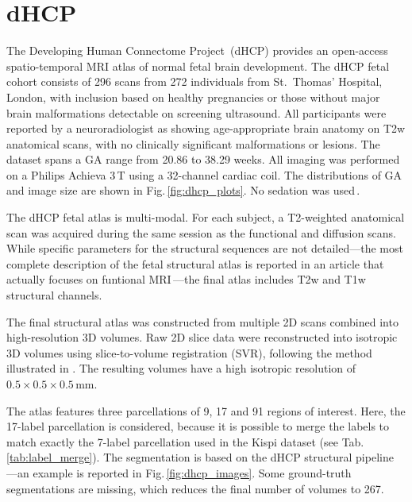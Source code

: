 \section{dHCP}
The Developing Human Connectome Project\,\cite{dHCP} (dHCP) provides an open-access spatio-temporal MRI atlas of normal fetal brain development. The dHCP fetal cohort consists of 296 scans from 272 individuals from St.\ Thomas' Hospital, London, with inclusion based on healthy pregnancies or those without major brain malformations detectable on screening ultrasound. All participants were reported by a neuroradiologist as showing age-appropriate brain anatomy on T2w anatomical scans, with no clinically significant malformations or lesions. The dataset spans a GA range from 20.86 to 38.29 weeks. All imaging was performed on a Philips Achieva 3\,T using a 32-channel cardiac coil. The distributions of GA and image size are shown in Fig.\,\ref{fig:dhcp_plots}. No sedation was used\,\cite{Karolis2025}.

The dHCP fetal atlas is multi-modal. For each subject, a T2-weighted anatomical scan was acquired during the same session as the functional and diffusion scans. While specific parameters for the structural sequences are not detailed---the most complete description of the fetal structural atlas is reported in an article that actually focuses on funtional MRI\,\cite{Karolis2025}---the final atlas includes T2w and T1w structural channels.

The final structural atlas was constructed from multiple 2D scans combined into high-resolution 3D volumes. Raw 2D slice data were reconstructed into isotropic 3D volumes using slice-to-volume registration (SVR), following the method illustrated in \cite{CorderoGrande2018}. The resulting volumes have a high isotropic resolution of $0.5 \times 0.5 \times 0.5$\,mm.

The atlas features three parcellations of 9, 17 and 91 regions of interest. Here, the 17-label parcellation is considered, because it is possible to merge the labels to match exactly the 7-label parcellation used in the Kispi dataset (see Tab.\,\ref{tab:label_merge}). The segmentation is based on the dHCP structural pipeline\,\cite{Makropoulos2018, dHCP_pipeline}---an example is reported in Fig.\,\ref{fig:dhcp_images}. Some ground-truth segmentations are missing, which reduces the final number of volumes to 267.

